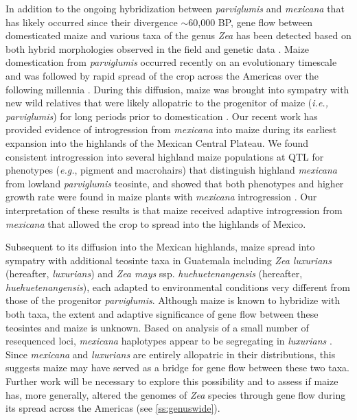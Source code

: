 In addition to the ongoing hybridization between \emph{parviglumis} and \emph{mexicana} that has likely occurred since their divergence $\sim$60,000 BP, gene flow between domesticated maize and various taxa of the genus \emph{Zea} has been detected based on both hybrid morphologies observed in the field \citep{wilkes1967teosinte, Wilkes1977} and genetic data \citep{Fukunaga2005,Ross-Ibarra2009a}. 
Maize domestication from \emph{parviglumis} occurred recently on an evolutionary timescale \citep[$\sim$9,000BP;][]{Matsuoka2002} and was followed by rapid spread of the crop across the Americas over the following millennia \citep{Piperno2001,Grobman2012}. 
During this diffusion, maize was brought into sympatry with new wild relatives that were likely allopatric to the progenitor of maize (\emph{i.e., parviglumis}) for long periods prior to domestication \citep{hufford2012inferences}. 
Our recent work has provided evidence of introgression from \emph{mexicana} into maize during its earliest expansion into the highlands of the Mexican Central Plateau.  
We found consistent introgression into several highland maize populations at QTL for phenotypes (\emph{e.g.}, pigment and macrohairs) that distinguish highland \emph{mexicana} from lowland \emph{parviglumis} teosinte, and showed that both \zm{} phenotypes and higher growth rate were found in maize plants with \emph{mexicana} introgression \citep{Hufford2013}.
Our interpretation of these results is that maize received adaptive introgression from \emph{mexicana} that allowed the crop to spread into the highlands of Mexico. 

Subsequent to its diffusion into the Mexican highlands, maize spread into sympatry with additional teosinte taxa in Guatemala including \emph{Zea luxurians} (hereafter, \emph{luxurians}) and \emph{Zea mays} ssp. \emph{huehuetenangensis} (hereafter, \emph{huehuetenangensis}), each adapted to environmental conditions very different from those of the progenitor \emph{parviglumis}. 
Although maize is known to hybridize with both taxa, the extent and adaptive significance of gene flow between these teosintes and maize is unknown.  
Based on analysis of a small number of resequenced loci, \emph{mexicana} haplotypes appear to be segregating in \emph{luxurians} \citep{Ross-Ibarra2009a}.  
Since \emph{mexicana} and \emph{luxurians} are entirely allopatric in their distributions, this suggests maize may have served as a bridge for gene flow between these two taxa.  
Further work will be necessary to explore this possibility and to assess if maize has, more generally, altered the genomes of \emph{Zea} species through gene flow during its spread across the Americas (see \ref{ss:genuswide}).

